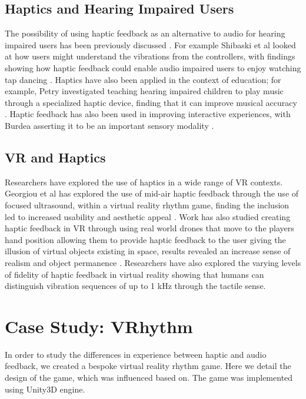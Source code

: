 \documentclass[manuscript,screen]{acmart}
\begin{document}
\subsection{Haptics and Hearing Impaired Users}
The possibility of using haptic feedback as an alternative to audio for hearing impaired users has been previously discussed \cite{petry2018design}. For example Shibaski et al looked at how users might understand the vibrations from the controllers, with findings showing how haptic feedback could enable audio impaired users to enjoy watching tap dancing \cite{shibasaki2016designing}. Haptics have also been applied in the context of education; for example, Petry investigated teaching hearing impaired children to play music through a specialized haptic device, finding that it can improve musical accuracy \cite{petry2018design}. Haptic feedback has also been used in improving interactive experiences, with Burdea asserting it to be an important sensory modality \cite{burdea1999haptic}. 

\subsection{VR and Haptics}
Researchers have explored the use of haptics in a wide range of VR contexts. Georgiou et al has explored the use of mid-air haptic feedback through the use of focused ultrasound, within a virtual reality rhythm game, finding the inclusion led to increased usability and aesthetic appeal \cite{8446619}. Work has also studied creating haptic feedback in VR through using real world drones that move to the players hand position allowing them to provide haptic feedback to the user giving the illusion of virtual objects existing in space, results revealed an increase sense of realism and object permanence \cite{hoppe2018vrhapticdrones}. Researchers have also explored the varying levels of fidelity of haptic feedback in virtual reality showing that humans can distinguish vibration sequences of up to 1 kHz through the tactile sense\cite{pausch1997quantifying}.

\section{Case Study: VRhythm}
In order to study the differences in experience between haptic and audio feedback, we created a bespoke virtual reality rhythm game. Here we detail the design of the game, which was influenced based on\cite{BeatSaber:VR}. The game was implemented using Unity3D engine.\cite{haas2014history}
\end{document}
